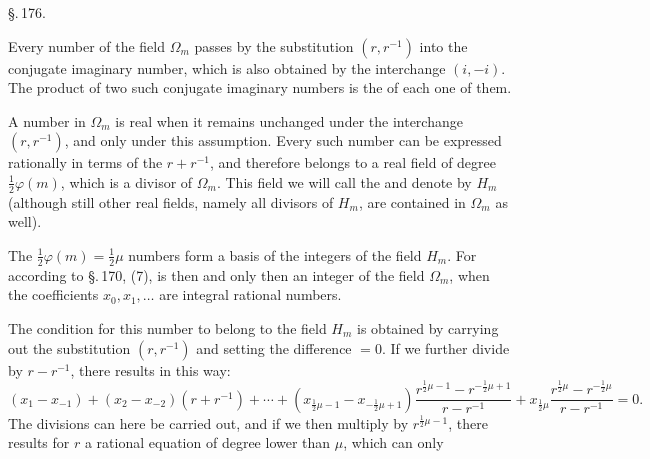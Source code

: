\begin{center}
\S.\,176.\\[4pt]
\end{center}

Every number of the field $\Omega_m$ passes by the substitution $(r, r^{-1})$ into the conjugate imaginary number, which is also obtained by the interchange $(i, -i)$. The product of two such conjugate imaginary numbers is the  of each one of them.

A number in $\Omega_m$ is real when it remains unchanged under the interchange $(r, r^{-1})$, and only under this assumption. Every such number can be expressed rationally in terms of the  $r + r^{-1}$, and therefore belongs to a real field of degree $\frac12\varphi(m)$, which is a divisor of $\Omega_m$. This field we will call the  and denote by $H_m$ (although still other real fields, namely all divisors of $H_m$, are contained in $\Omega_m$ as well).

The $\frac12\varphi(m) = \frac12\mu$ numbers
form a basis of the integers of the field $H_m$. For according to \S.\,170, (7),
is then and only then an integer of the field $\Omega_m$, when the coefficients $x_0, x_1, \dots$ are integral rational numbers.

The condition for this number to belong to the field $H_m$ is obtained by carrying out the substitution $(r, r^{-1})$ and setting the difference $=0$. If we further divide by $r-r^{-1}$, there results in this way:
\[
(x_1-x_{-1})+(x_2-x_{-2})(r+r^{-1})+\cdots
+(x_{\frac12\mu-1}-x_{-\frac12\mu+1})\frac{r^{\frac12\mu-1}-r^{-\frac12\mu+1}}{r-r^{-1}}
+x_{\frac12\mu}\frac{r^{\frac12\mu}-r^{-\frac12\mu}}{r-r^{-1}}=0.
\]
The divisions can here be carried out, and if we then multiply by $r^{\frac12\mu-1}$, there results for $r$ a rational equation of degree lower than $\mu$, which can only
